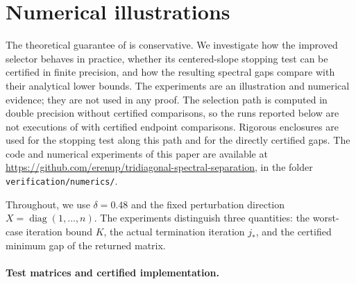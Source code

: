 \documentclass[10pt,a4paper]{article}
\DeclareMathOperator{\diag}{diag}
\begin{document}
\section{Numerical illustrations}
\label{sec:numerics}

The theoretical guarantee of  is 
conservative. We investigate how the improved selector behaves in
practice, whether its centered-slope stopping test can be certified
in finite precision, and how the resulting spectral gaps compare
with their analytical lower bounds.
The experiments are an illustration and numerical evidence;
they are not used in any proof. The selection path is computed
in double precision without certified comparisons, so the runs
reported below are not executions of  with
certified endpoint comparisons. Rigorous enclosures are used for
the stopping test along this path and for the directly certified
gaps. The code and numerical experiments of this paper are
available at
\url{https://github.com/erenup/tridiagonal-spectral-separation},
in the folder \texttt{verification/numerics/}.

Throughout, we use $\delta=0.48$ and the fixed perturbation direction
$X=\diag(1,\ldots,n)$. The experiments distinguish three quantities:
the worst-case iteration bound $K$, the actual termination iteration
$j_*$, and the certified minimum gap of the returned matrix.


\paragraph{Test matrices and certified implementation.}
\label{subsec:numerical-setup}
\end{document}
